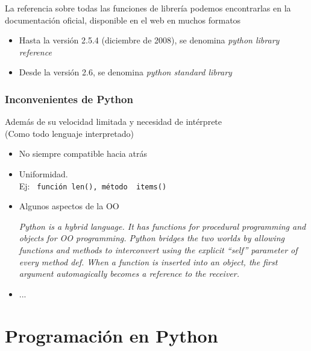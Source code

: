 \documentclass[ucs]{beamer}
\begin{document}
\begin{frame}[fragile]
La referencia sobre todas las funciones de librería podemos encontrarlas
en la documentación oficial, disponible en el web en muchos formatos
\begin{itemize}
\item
Hasta la versión 2.5.4 (diciembre de 2008), se denomina
\emph{python library reference}
\item
Desde la versión 2.6, se denomina \emph{python standard library}
\end{itemize}
\end{frame}


\begin{frame}[fragile]
\frametitle{Inconvenientes de Python}
Además de su velocidad limitada y necesidad de intérprete\\
(Como todo lenguaje interpretado)
\begin{itemize}

\item 
No siempre compatible hacia atrás
\item 
Uniformidad. \\Ej:
\verb| función len(), método  items()|
\item 
Algunos aspectos de la OO

\begin{small}
\emph{Python is a hybrid language. It has functions for procedural programming and objects for OO programming. Python bridges the two worlds by allowing functions and methods to interconvert using the explicit ``self'' parameter of every method def. When a function is inserted into an object, the first argument automagically becomes a reference to the receiver.} 

\end{small}
\item 
...
\end{itemize}


\end{frame}

\section{Programación en Python}
\end{document}
